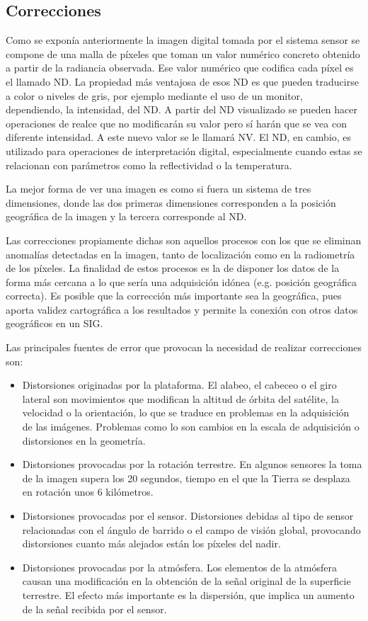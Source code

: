 \subsection{Correcciones}
Como se exponía anteriormente la imagen digital tomada por el sistema sensor se compone de una malla de píxeles que toman un valor numérico concreto obtenido a partir de la radiancia observada. Ese valor numérico que codifica cada píxel es el llamado \ac{ND}. La propiedad más ventajosa de esos \ac{ND} es que pueden traducirse a color o niveles de gris, por ejemplo mediante el uso de un monitor, dependiendo, la intensidad, del \ac{ND}. A partir del \ac{ND} visualizado se pueden hacer operaciones de realce que no modificarán su valor pero sí harán que se vea con diferente intensidad. A este nuevo valor se le llamará \ac{NV}. El \ac{ND}, en cambio, es utilizado para operaciones de interpretación digital, especialmente cuando estas se relacionan con parámetros como la reflectividad o la temperatura.\Sep

La mejor forma de ver una imagen es como si fuera un sistema de tres dimensiones, donde las dos primeras dimensiones corresponden a la posición geográfica de la imagen y la tercera corresponde al \ac{ND}.\Sep

Las correcciones propiamente dichas son aquellos procesos con los que se eliminan anomalías detectadas en la imagen, tanto de localización como en la radiometría de los píxeles. La finalidad de estos procesos es la de disponer los datos de la forma más cercana a lo que sería una adquisición idónea (e.g. posición geográfica correcta). Es posible que la corrección más importante sea la geográfica, pues aporta validez cartográfica a los resultados y permite la conexión con otros datos geográficos en un \ac{SIG}.\Sep

Las principales fuentes de error que provocan la necesidad de realizar correcciones son:
\begin{itemize}
	\item Distorsiones originadas por la plataforma. El alabeo, el cabeceo o el giro lateral son movimientos que modifican la altitud de órbita del satélite, la velocidad o la orientación, lo que se traduce en problemas en la adquisición de las imágenes. Problemas como lo son cambios en la escala de adquisición o distorsiones en la geometría.
	\item Distorsiones provocadas por la rotación terrestre. En algunos sensores la toma de la imagen supera los 20 segundos, tiempo en el que la Tierra se desplaza en rotación unos 6 kilómetros.
	\item Distorsiones provocadas por el sensor. Distorsiones debidas al tipo de sensor relacionadas con el ángulo de barrido o el campo de visión global, provocando distorsiones cuanto más alejados están los píxeles del nadir.
	\item Distorsiones provocadas por la atmósfera. Los elementos de la atmósfera causan una modificación en la obtención de la señal original de la superficie terrestre. El efecto más importante es la dispersión, que implica un aumento de la señal recibida por el sensor.
\end{itemize}

